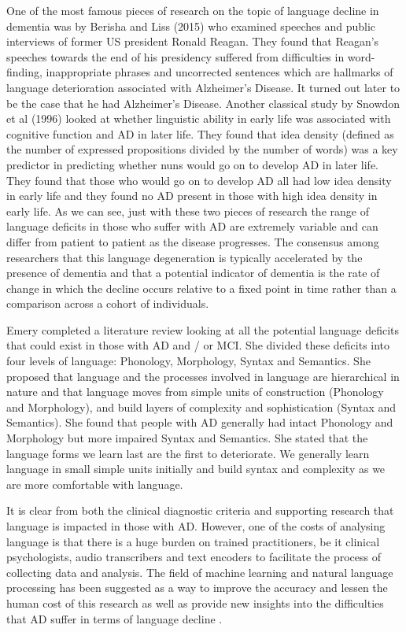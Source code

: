 \documentclass{article}
\begin{document}
\par
One of the most famous pieces of research on the topic of language decline in dementia was by Berisha and Liss (2015) \cite{Berisha2015} who examined speeches and public interviews of former US president Ronald Reagan. They found that Reagan's speeches towards the end of his presidency suffered from difficulties in word-finding, inappropriate phrases and uncorrected sentences which are hallmarks of language deterioration associated with Alzheimer's Disease. It turned out later to be the case that he had Alzheimer's Disease. Another classical study by Snowdon et al (1996) \cite{Snowdon1996} looked at whether linguistic ability in early life was associated with cognitive function and AD in later life. They found that idea density (defined as the number of expressed propositions divided by the number of words) was a key predictor in predicting whether nuns would go on to develop AD in later life. They found that those who would go on to develop AD all had low idea density in early life and they found no AD present in those with high idea density in early life. As we can see, just with these two pieces of research the range of language deficits in those who suffer with AD are extremely variable and can differ from patient to patient as the disease progresses. The consensus among researchers that this language degeneration is typically accelerated by the presence of dementia \cite{Berisha2015} and that a potential indicator of dementia is the rate of change in which the decline occurs relative to a fixed point in time rather than a comparison across a cohort of individuals. 
\par
Emery \cite{Emery2000} completed a literature review looking at all the potential language deficits that could exist in those with AD and / or MCI. She divided these deficits into four levels of language: Phonology, Morphology, Syntax and Semantics. She proposed that language and the processes involved in language are hierarchical in nature and that language moves from simple units of construction (Phonology and Morphology), and build layers of complexity and sophistication (Syntax and Semantics). She found that people with AD generally had intact Phonology and Morphology but more impaired Syntax and Semantics. She stated that the language forms we learn last are the first to deteriorate. We generally learn language in small simple units initially and build syntax and complexity as we are more comfortable with language.
\par
It is clear from both the clinical diagnostic criteria and supporting research that language is impacted in those with AD. However, one of the costs of analysing language is that there is a huge burden on trained practitioners, be it clinical psychologists, audio transcribers and text encoders to facilitate the process of collecting data and analysis. The field of machine learning and natural language processing has been suggested as a way to improve the accuracy and lessen the human cost of this research as well as provide new insights into the difficulties that AD suffer in terms of language decline \cite{Boschi2017}.
\end{document}
